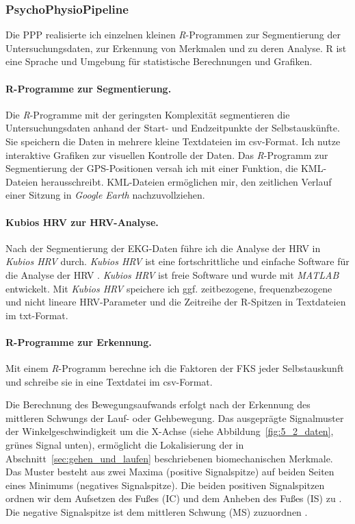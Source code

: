 \subsubsection{PsychoPhysioPipeline}
Die \ac{PPP} realisierte ich einzelnen kleinen \emph{R}-Programmen zur Segmentierung der Untersuchungsdaten, zur Erkennung von Merkmalen und zu deren Analyse. R ist eine Sprache und Umgebung für statistische Berechnungen und Grafiken.

\paragraph{R-Programme zur Segmentierung.}
Die \emph{R}-Programme mit der geringsten Komplexität segmentieren die Untersuchungsdaten anhand der Start- und Endzeitpunkte der Selbstauskünfte. Sie speichern die Daten in mehrere kleine Textdateien im \acs{csv}-Format. Ich nutze interaktive Grafiken zur visuellen Kontrolle der Daten. Das \emph{R}-Programm zur Segmentierung der \ac{GPS}-Positionen versah ich mit einer Funktion, die \acs{KML}-Dateien herausschreibt. \acs{KML}-Dateien ermöglichen mir, den zeitlichen Verlauf einer Sitzung in \emph{Google Earth} nachzuvollziehen.

\paragraph{Kubios HRV zur HRV-Analyse.}
Nach der Segmentierung der \ac{EKG}-Daten führe ich die Analyse der \ac{HRV} in \emph{Kubios HRV} durch. \emph{Kubios HRV} ist eine fortschrittliche und einfache Software für die Analyse der \ac{HRV} \citep{Tarvainen2014}. \emph{Kubios HRV} ist freie Software und wurde mit \emph{MATLAB} entwickelt. Mit \emph{Kubios HRV} speichere ich ggf. zeitbezogene, frequenzbezogene und nicht lineare \ac{HRV}-Parameter und die Zeitreihe der R-Spitzen in Textdateien im txt-Format.

\paragraph{R-Programme zur Erkennung.}
\label{par:r_programme_zur_erkennung}
Mit einem \emph{R}-Programm berechne ich die Faktoren der \ac{FKS} jeder Selbstauskunft und schreibe sie in eine Textdatei im \acs{csv}-Format.

Die Berechnung des Bewegungsaufwands erfolgt nach der Erkennung des mittleren Schwungs der Lauf- oder Gehbewegung. Das ausgeprägte Signalmuster der Winkelgeschwindigkeit um die X-Achse (siehe Abbildung~\ref{fig:5_2_daten}, grünes Signal unten), ermöglicht die Lokalisierung der in Abschnitt~\ref{sec:gehen_und_laufen} beschriebenen biomechanischen Merkmale. Das Muster besteht aus zwei Maxima (positive Signalspitze) auf beiden Seiten eines Minimums (negatives Signalspitze). Die beiden positiven Signalspitzen ordnen wir dem Aufsetzen des Fußes (\ac{IC}) und dem Anheben des Fußes (\ac{IS}) zu \citep[vgl.][]{Aminian2002}. Die negative Signalspitze ist dem mittleren Schwung (\ac{MS}) zuzuordnen \citep[vgl.][]{Aminian2002}.

